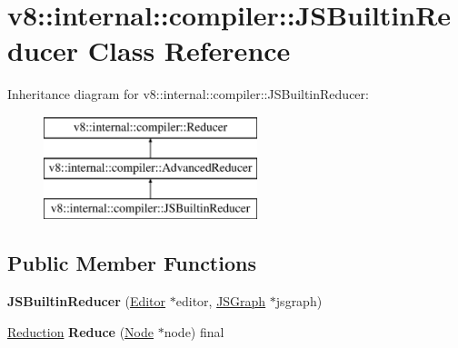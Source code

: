 \hypertarget{classv8_1_1internal_1_1compiler_1_1_j_s_builtin_reducer}{}\section{v8\+:\+:internal\+:\+:compiler\+:\+:J\+S\+Builtin\+Reducer Class Reference}
\label{classv8_1_1internal_1_1compiler_1_1_j_s_builtin_reducer}
Inheritance diagram for v8\+:\+:internal\+:\+:compiler\+:\+:J\+S\+Builtin\+Reducer\+:\begin{figure}[H]
\begin{center}
\leavevmode
\includegraphics[height=3.000000cm]{classv8_1_1internal_1_1compiler_1_1_j_s_builtin_reducer}
\end{center}
\end{figure}
\subsection*{Public Member Functions}
\begin{DoxyCompactItemize}
\item 
{\bfseries J\+S\+Builtin\+Reducer} (\hyperlink{classv8_1_1internal_1_1compiler_1_1_advanced_reducer_1_1_editor}{Editor} $\ast$editor, \hyperlink{classv8_1_1internal_1_1compiler_1_1_j_s_graph}{J\+S\+Graph} $\ast$jsgraph)\hypertarget{classv8_1_1internal_1_1compiler_1_1_j_s_builtin_reducer_a74228dfe668cbad0bf2d93bdcacf1f8a}{}\label{classv8_1_1internal_1_1compiler_1_1_j_s_builtin_reducer_a74228dfe668cbad0bf2d93bdcacf1f8a}

\item 
\hyperlink{classv8_1_1internal_1_1compiler_1_1_reduction}{Reduction} {\bfseries Reduce} (\hyperlink{classv8_1_1internal_1_1compiler_1_1_node}{Node} $\ast$node) final\hypertarget{classv8_1_1internal_1_1compiler_1_1_j_s_builtin_reducer_a1a2b12e96a69037de53f4267374eca9b}{}\label{classv8_1_1internal_1_1compiler_1_1_j_s_builtin_reducer_a1a2b12e96a69037de53f4267374eca9b}

\end{DoxyCompactItemize}
